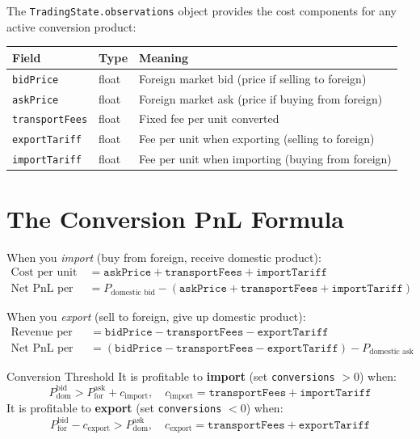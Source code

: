 \documentclass[12pt,a4paper,openany]{report}
\theoremstyle{definition}
\begin{document}
The \texttt{TradingState.observations} object provides the cost components for any active conversion product:

\begin{center}
\renewcommand{\arraystretch}{1.4}
\begin{tabular}{lll}
\toprule
\textbf{Field} & \textbf{Type} & \textbf{Meaning} \\
\midrule
\texttt{bidPrice} & float & Foreign market bid (price if selling to foreign) \\
\texttt{askPrice} & float & Foreign market ask (price if buying from foreign) \\
\texttt{transportFees} & float & Fixed fee per unit converted \\
\texttt{exportTariff} & float & Fee per unit when exporting (selling to foreign) \\
\texttt{importTariff} & float & Fee per unit when importing (buying from foreign) \\
\bottomrule
\end{tabular}
\end{center}

\section{The Conversion PnL Formula}

When you \emph{import} (buy from foreign, receive domestic product):
\begin{align}
  \text{Cost per unit} &= \texttt{askPrice} + \texttt{transportFees} + \texttt{importTariff} \\
  \text{Net PnL per unit} &= P_{\text{domestic bid}} - (\texttt{askPrice} + \texttt{transportFees} + \texttt{importTariff})
\end{align}

When you \emph{export} (sell to foreign, give up domestic product):
\begin{align}
  \text{Revenue per unit} &= \texttt{bidPrice} - \texttt{transportFees} - \texttt{exportTariff} \\
  \text{Net PnL per unit} &= (\texttt{bidPrice} - \texttt{transportFees} - \texttt{exportTariff}) - P_{\text{domestic ask}}
\end{align}

\begin{definitionbox}{Conversion Threshold}
It is profitable to \textbf{import} (set \texttt{conversions} $> 0$) when:
\[
  P_{\text{dom}}^{\text{bid}} > P_{\text{for}}^{\text{ask}} + c_{\text{import}}, \quad c_{\text{import}} = \texttt{transportFees} + \texttt{importTariff}
\]
It is profitable to \textbf{export} (set \texttt{conversions} $< 0$) when:
\[
  P_{\text{for}}^{\text{bid}} - c_{\text{export}} > P_{\text{dom}}^{\text{ask}}, \quad c_{\text{export}} = \texttt{transportFees} + \texttt{exportTariff}
\]
\end{definitionbox}
\end{document}

